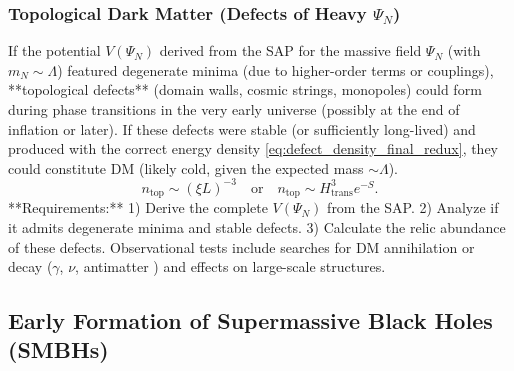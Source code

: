 \documentclass[11pt, a4paper]{article}
\theoremstyle{remark}
\begin{document}
\subsubsection{Topological Dark Matter (Defects of Heavy \texorpdfstring{$\Psi_N$}{PsiN})}
\label{sec:dm_topologica_final_revised}
If the potential \( V(\Psi_N) \) derived from the SAP for the massive field \( \Psi_N \) (with \( m_N \sim \Lambda \)) featured degenerate minima (due to higher-order terms or couplings), **topological defects** (domain walls, cosmic strings, monopoles) could form during phase transitions in the very early universe (possibly at the end of inflation or later). If these defects were stable (or sufficiently long-lived) and produced with the correct energy density \eqref{eq:defect_density_final_redux}, they could constitute DM (likely cold, given the expected mass \( \sim \Lambda \)).
\begin{equation} \label{eq:defect_density_final_redux}
n_{\text{top}} \sim (\xi L)^{-3} \quad \text{or} \quad n_{\text{top}} \sim H_{\text{trans}}^3 e^{-S}.
\end{equation}
**Requirements:** 1) Derive the complete \( V(\Psi_N) \) from the SAP. 2) Analyze if it admits degenerate minima and stable defects. 3) Calculate the relic abundance of these defects. Observational tests include searches for DM annihilation or decay (\(\gamma\), \(\nu\), antimatter \citep{Hooper2017_HAWC, PDG2022}) and effects on large-scale structures.

\subsection{Early Formation of Supermassive Black Holes (SMBHs)}
\label{subsec:smbh_formation_final_revised}
\end{document}
